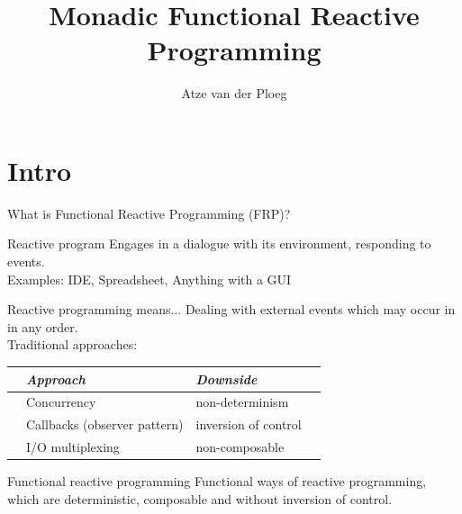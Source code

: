 \documentclass{beamer}
\title{Monadic Functional Reactive Programming}
\author{Atze van der Ploeg}
\institute{
Centrum Wiskunde \& Informatica, Amsterdam, The Netherlands}
\begin{document}



\begin{frame}[plain]
\begin{center}
  \scalebox{12}{$\bind$}
\end{center}
\vspace{-0.5cm}
  \titlepage
\end{frame}

\section{Intro}



\newcommand{\inlineitem}{%
{\color{navyblue} \leavevmode\usebeamertemplate{itemize item} }
}

\begin{frame}{What is Functional Reactive Programming (FRP)?}
\begin{block}{Reactive program}
Engages in a dialogue with its environment, responding to events.\\

Examples: IDE, Spreadsheet, Anything with a GUI
\end{block}
\begin{block}{Reactive programming means...}
Dealing with external events which may occur in \alert{in any order}.\\
\vspace{0.2cm}
Traditional approaches:\\
\begin{tabular}{l l l l}
  & \emph{Approach} & \emph{Downside}\\
\hline
\inlineitem & Concurrency & non-determinism\\
\inlineitem & Callbacks (observer pattern) & inversion of control \\
\inlineitem & I/O multiplexing & non-composable\\
\end{tabular}
\end{block}

\begin{block}{Functional reactive programming}
Functional ways of reactive programming, which are \alert{deterministic}, \alert{composable} and \alert{without inversion of control}.
\end{block}


\end{frame}
\end{document}
